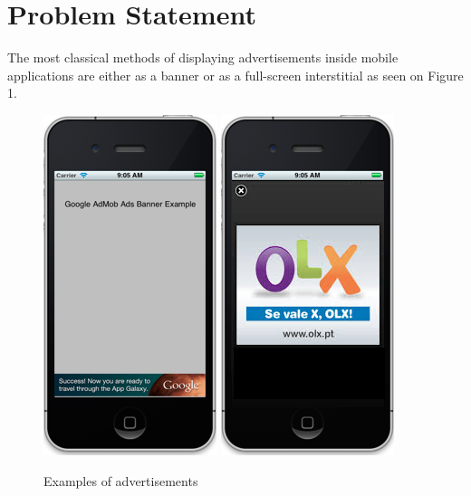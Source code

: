 
\chapter{Problem Statement} %


The most classical methods of displaying advertisements inside mobile applications are either as a banner or as a full-screen interstitial as seen on Figure 1.

\begin{figure}
\begin{center}
\includegraphics{Images/banner.png}
\includegraphics{Images/fullscreen.png}
\caption{Examples of advertisements \cite{image:banner_ad} \cite{image:interstitial_ad}}
\end{center}
\end{figure}

